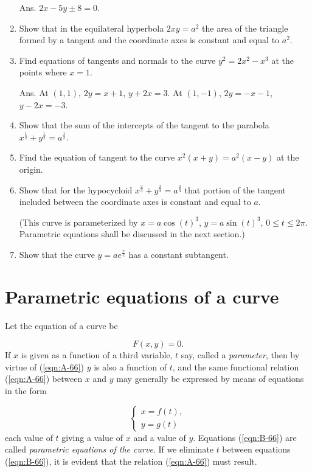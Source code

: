 \begin{enumerate}
Ans. $2x - 5y \pm 8 = 0$.

\item
Show that in the equilateral hyperbola 
$2xy = a^2$ the area of the triangle formed by a tangent 
and the coordinate axes is constant and equal to $a^2$.

\item
Find equations of tangents and normals to the curve 
$y^2 = 2x^2 - x^3$ at the points where $x = 1$.

Ans. At $(1,1)$, $2y = x + 1$, $y + 2x = 3$.
At $(1,-1)$, $2y =-x-1$, $y-2x = -3$.

\item
Show that the sum of the intercepts of the tangent to the parabola
$x^{\frac{1}{2}} + y^{\frac{1}{2}} = a^{\frac{1}{2}}$.

\item
Find the equation of tangent to the curve 
$x^2(x + y) = a^2(x-y)$ at the origin.

\item
Show that for the hypocycloid 
$x^{\frac{2}{3}} + y^{\frac{2}{3}} = a^{\frac{2}{3}}$ that 
portion of the tangent included between the coordinate 
axes is constant and equal to $a$.

\noindent
(This curve is parameterized by $x=a\cos(t)^3$, 
$y=a\sin(t)^3$, $0\leq t\leq 2\pi$. Parametric equations shall be 
discussed in the next section.)
 
\item
Show that the curve $y = ae^{\frac{x}{c}}$ has a constant subtangent.

\end{enumerate}

\section{Parametric equations of a curve}
\label{sec:66}

Let the equation of a curve be

\begin{equation}
F(x,y) = 0.
\label{eqn:A-66}
\end{equation}
If $x$ is given as a function of a third variable, $t$ say, 
called a {\it parameter}, then by virtue of (\ref{eqn:A-66}) 
$y$ is also a function of $t$, and the same functional 
relation (\ref{eqn:A-66}) between $x$ and $y$ may generally 
be expressed by means of equations in the form

\begin{equation}
\begin{cases} 
x = f(t), \\ 
y = g(t) 
\end{cases}
\label{eqn:B-66}
\end{equation}
each value of $t$ giving a value of $x$ and a value of $y$. 
Equations (\ref{eqn:B-66}) are called 
{\it parametric equations of the curve}. 
If we eliminate $t$ between equations (\ref{eqn:B-66}), 
it is evident that the relation (\ref{eqn:A-66}) must result. 

